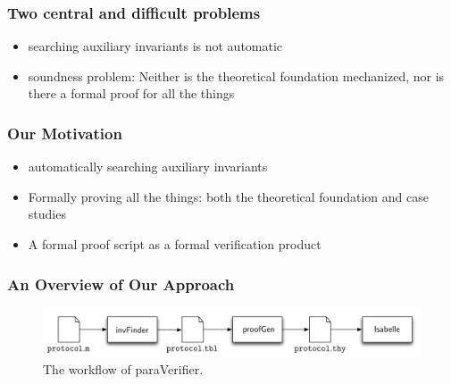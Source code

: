 \documentclass{beamer}
\begin{document}
\begin{frame}\frametitle{Two central and difficult problems}
\begin{itemize}
\item  searching auxiliary invariants is not automatic
\pause
\item  soundness problem: Neither is the theoretical foundation   mechanized, nor  is there  a formal proof for all the things
\end{itemize}

\end{frame}

\begin{frame}\frametitle{Our Motivation}

\begin{itemize}
\item automatically searching  auxiliary invariants
\pause
\item Formally proving all the things: both the theoretical foundation and case studies

\item A formal proof script as a formal verification product
\end{itemize}
\end{frame}



\begin{frame}\frametitle{An Overview of Our Approach}


\begin{figure}[!t]
\centering
\includegraphics[width=1.0\textwidth]{paraVerifierWorkFlow.pdf}

\caption{The workflow of {\sf paraVerifier}.}
\label{fig:arch}
\end{figure}
\end{frame}
\end{document}

